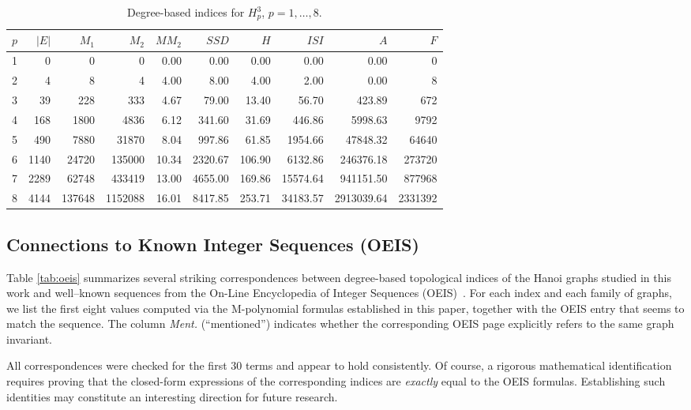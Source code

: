 \documentclass[letterpaper,12pt]{article}
\begin{document}
\begin{table}[H]
\centering
\begin{tabular}{r|r r r r r r r r r}
\toprule
$p$ & $|E|$ & $M_1$ & $M_2$ & $MM_2$ & $SSD$ & $H$ & $ISI$ & $A$ & $F$ \\
\midrule
1 & 0 & 0 & 0 & 0.00 & 0.00 & 0.00 & 0.00 & 0.00 & 0 \\
2 & 4 & 8 & 4 & 4.00 & 8.00 & 4.00 & 2.00 & 0.00 & 8 \\
3 & 39 & 228 & 333 & 4.67 & 79.00 & 13.40 & 56.70 & 423.89 & 672 \\
4 & 168 & 1800 & 4836 & 6.12 & 341.60 & 31.69 & 446.86 & 5998.63 & 9792 \\
5 & 490 & 7880 & 31870 & 8.04 & 997.86 & 61.85 & 1954.66 & 47848.32 & 64640 \\
6 & 1140 & 24720 & 135000 & 10.34 & 2320.67 & 106.90 & 6132.86 & 246376.18 & 273720 \\
7 & 2289 & 62748 & 433419 & 13.00 & 4655.00 & 169.86 & 15574.64 & 941151.50 & 877968 \\
8 & 4144 & 137648 & 1152088 & 16.01 & 8417.85 & 253.71 & 34183.57 & 2913039.64 & 2331392 \\
\bottomrule
\end{tabular}
\caption{Degree-based indices for $H_{p}^{3}$, $p = 1, \dots, 8$.}
\label{tab:indices-n3-p1to8}
\end{table}


 




\subsection*{Connections to Known Integer Sequences (OEIS)}
Table \ref{tab:oeis}  summarizes several striking correspondences between
degree-based topological indices of the Hanoi graphs studied in this work
and well–known sequences from the On-Line Encyclopedia of Integer Sequences
(OEIS)~\cite{OEIS}.  
For each index and each family of graphs, we list the first eight values
computed via the M-polynomial formulas established in this paper, together
with the OEIS entry that seems to match the sequence.  
The column \textit{Ment.} (“mentioned”) indicates whether the corresponding
OEIS page explicitly refers to the same graph invariant.

All correspondences were checked for the first $30$ terms and appear to hold
consistently.  
Of course, a rigorous mathematical identification requires proving that the
closed-form expressions of the corresponding indices are \emph{exactly}
equal to the OEIS formulas.  
Establishing such identities may constitute an interesting direction for
future research.
\end{document}
